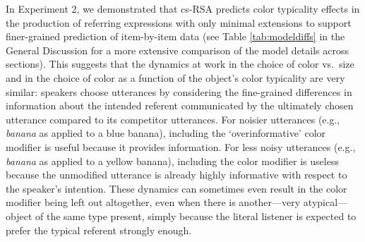 \documentclass[11pt]{article}
\newcommand{\tableref}[1]{Table \ref{#1}}
\newcommand{\sectionref}[1]{Section \ref{#1}}
\begin{document}
In Experiment 2, we demonstrated that cs-RSA predicts color typicality effects in the production of referring expressions with only minimal extensions to support finer-grained prediction of item-by-item data (see \tableref{tab:modeldiffs} in the General Discussion for a more extensive comparison of the model details across sections). %
This suggests that the dynamics at work in the choice of color vs.~size and in the choice of color as a function of the object's color typicality are very similar: speakers choose utterances by considering the fine-grained differences in information about the intended referent communicated by the ultimately chosen utterance compared to its competitor utterances. For noisier utterances (e.g., \emph{banana} as applied to a blue banana), including the `overinformative' color modifier is useful because it provides information. For less noisy utterances (e.g., \emph{banana} as applied to a yellow banana), including the color modifier is useless because the unmodified utterance is already highly informative with respect to the speaker's intention. These dynamics can sometimes even result in the color modifier being left out altogether, even when there is another---very atypical---object of the same type present, simply because the literal listener is expected to prefer the typical referent strongly enough.
\end{document}
